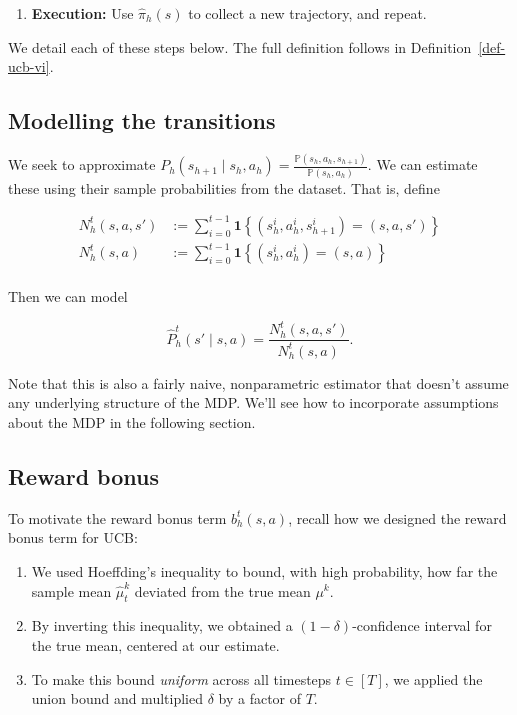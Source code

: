 \documentclass[
  letterpaper,
  DIV=11,
  numbers=noendperiod]{scrreprt}
\providecommand{\tightlist}{%
  \setlength{\itemsep}{0pt}\setlength{\parskip}{0pt}}\usepackage{longtable,booktabs,array}
\theoremstyle{plain}
\theoremstyle{plain}
\theoremstyle{definition}
\theoremstyle{definition}
\theoremstyle{remark}
\begin{document}
\begin{enumerate}
\def\labelenumi{\arabic{enumi}.}
\setcounter{enumi}{3}
\tightlist
\item
  \textbf{Execution:} Use \(\widehat \pi_h(s)\) to collect a new
  trajectory, and repeat.
\end{enumerate}

We detail each of these steps below. The full definition follows in
Definition~\ref{def-ucb-vi}.

\subsection{Modelling the transitions}\label{modelling-the-transitions}

We seek to approximate
\(P_h(s_{h+1} \mid s_h, a_h) = \frac{\mathbb{P}(s_h, a_h, s_{h+1})}{\mathbb{P}(s_h, a_h)}\).
We can estimate these using their sample probabilities from the dataset.
That is, define

\[\begin{aligned}
    N_h^t(s, a, s') & := \sum_{i=0}^{t-1} \mathbf{1}\left\{ (s_h^i, a_h^i, s_{h+1}^i) = (s, a, s') \right\} \\
    N_h^t(s, a)     & := \sum_{i=0}^{t-1} \mathbf{1}\left\{ (s_h^i, a_h^i) = (s, a) \right\}                \\
\end{aligned}\]

Then we can model

\[\widehat{P}_h^t(s' \mid s, a) = \frac{N_h^t(s, a, s')}{N_h^t(s, a)}.\]

Note that this is also a fairly naive, nonparametric estimator that
doesn't assume any underlying structure of the MDP. We'll see how to
incorporate assumptions about the MDP in the following section.

\subsection{Reward bonus}\label{reward-bonus}

To motivate the reward bonus term \(b_h^t(s, a)\), recall how we
designed the reward bonus term for UCB:

\begin{enumerate}
\def\labelenumi{\arabic{enumi}.}
\item
  We used Hoeffding's inequality to bound, with high probability, how
  far the sample mean \(\widehat \mu_t^k\) deviated from the true mean
  \(\mu^k\).
\item
  By inverting this inequality, we obtained a \((1-\delta)\)-confidence
  interval for the true mean, centered at our estimate.
\item
  To make this bound \emph{uniform} across all timesteps \(t \in [T]\),
  we applied the union bound and multiplied \(\delta\) by a factor of
  \(T\).
\end{enumerate}
\end{document}
